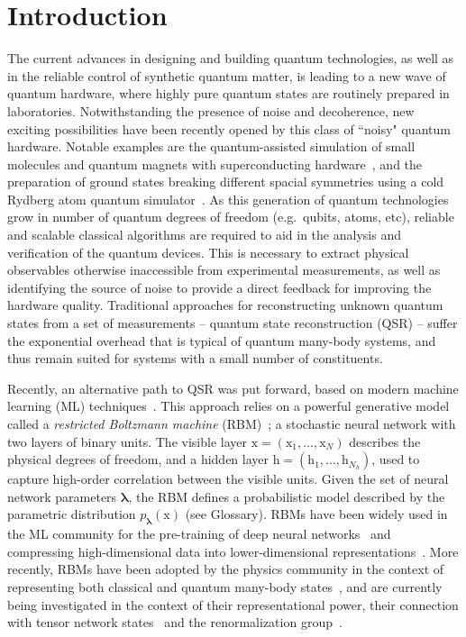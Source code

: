 \documentclass[submission, Phys, hidelinks]{SciPost}
\begin{document}
\section{Introduction}
	The current advances in designing and building quantum technologies, as well as in the reliable control of synthetic quantum matter, is leading to a new wave of quantum hardware, where highly pure quantum states are routinely prepared in laboratories. Notwithstanding the presence of noise and decoherence, new exciting possibilities have been recently opened by this class of ``noisy" quantum hardware. Notable examples are the quantum-assisted simulation of small molecules and quantum magnets with superconducting hardware~\cite{gambetta17,gambetta18}, and the preparation of ground states breaking different spacial symmetries using a cold Rydberg atom quantum simulator~\cite{Bernien17}. As this generation of quantum technologies grow in number of quantum degrees of freedom (e.g.~qubits, atoms, etc), reliable and scalable classical algorithms are required to aid in the analysis and verification of the quantum devices. This is necessary to extract physical observables otherwise inaccessible from experimental measurements, as well as identifying the source of noise to provide a direct feedback for improving the hardware quality. Traditional approaches for reconstructing unknown quantum states from a set of measurements -- quantum state reconstruction (QSR) -- suffer the exponential overhead that is typical of quantum many-body systems, and thus remain suited for systems with a small number of constituents. 

	Recently, an alternative path to QSR was put forward, based on modern machine learning (ML) techniques~\cite{torlai2018tomography,TorlaiMixed}. This approach relies on a powerful generative model called a {\it restricted Boltzmann machine} (RBM)~\cite{Smolensky}; a stochastic neural network with two layers of binary units. The visible layer $\bm{\mathrm{x}}=(\mathrm{x}_1,\dots,\mathrm{x}_N)$ describes the physical degrees of freedom, and a hidden layer $\bm{\mathrm{h}}=(\mathrm{h}_1,\dots,\mathrm{h}_{N_h})$, used to capture high-order correlation between the visible units. Given the set of neural network parameters $\bm{\lambda}$, the RBM defines a probabilistic model described by the parametric distribution $p_{\bm{\lambda}}(\bm{\mathrm{x}})$ (see Glossary). RBMs have been widely used in the ML community for the pre-training of deep neural networks~\cite{Hinton06} and compressing high-dimensional data into lower-dimensional representations~\cite{Hinton504}. More recently, RBMs have been adopted by the physics community in the context of representing both classical and quantum many-body states~\cite{Torlai2016thermo, CarleoTroyer2017Science}, and are currently being investigated in the context of their representational power, their connection with tensor network states~\cite{GlasserCirac2018} and the renormalization group~\cite{Maciej}.
\end{document}
